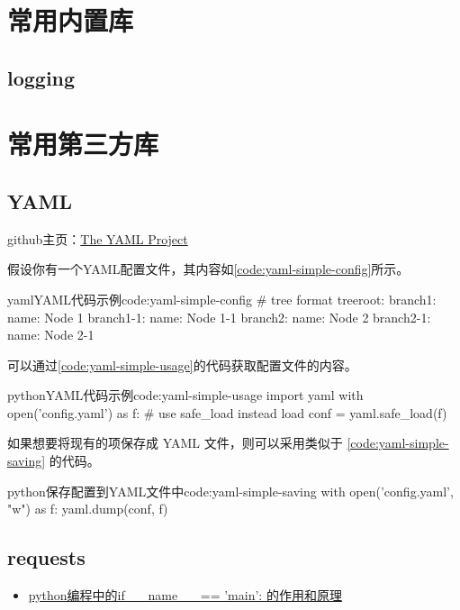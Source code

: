 \section{常用内置库}

\subsection{logging}


\section{常用第三方库}
\subsection{YAML}
github主页：\href{https://github.com/yaml}{The YAML Project}

假设你有一个YAML配置文件，其内容如\ref{code:yaml-simple-config}所示。

\begin{jcode}{yaml}{YAML代码示例}{code:yaml-simple-config}
# tree format
treeroot:
    branch1:
        name: Node 1
        branch1-1:
            name: Node 1-1
    branch2:
        name: Node 2
        branch2-1:
            name: Node 2-1
\end{jcode}

可以通过\ref{code:yaml-simple-usage}的代码获取配置文件的内容。

\begin{jcode}{python}{YAML代码示例}{code:yaml-simple-usage}
import yaml
with open('config.yaml') as f:
    # use safe_load instead load
    conf = yaml.safe_load(f)
\end{jcode}

如果想要将现有的项保存成 YAML 文件，则可以采用类似于 \ref{code:yaml-simple-saving} 的代码。
\begin{jcode}{python}{保存配置到YAML文件中}{code:yaml-simple-saving}
with open('config.yaml', "w") as f:
    yaml.dump(conf, f)
\end{jcode}


\subsection{requests}

\begin{itemize}
\item \href{http://www.dengfeilong.com/post/60.html}{python编程中的if \_\_name\_\_ == 'main': 的作用和原理}
\end{itemize}

